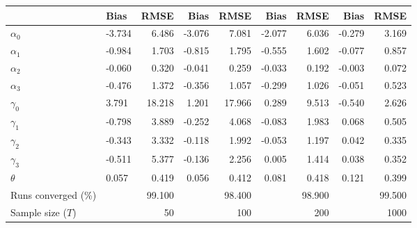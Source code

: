 
\begin{tabular}[t]{llrrrrrrr}
\toprule
  & Bias & RMSE & Bias & RMSE & Bias & RMSE & Bias & RMSE\\
\midrule
$\alpha_{0}$ & -3.734 & 6.486 & -3.076 & 7.081 & -2.077 & 6.036 & -0.279 & 3.169\\
$\alpha_{1}$ & -0.984 & 1.703 & -0.815 & 1.795 & -0.555 & 1.602 & -0.077 & 0.857\\
$\alpha_{2}$ & -0.060 & 0.320 & -0.041 & 0.259 & -0.033 & 0.192 & -0.003 & 0.072\\
$\alpha_{3}$ & -0.476 & 1.372 & -0.356 & 1.057 & -0.299 & 1.026 & -0.051 & 0.523\\
$\gamma_{0}$ & 3.791 & 18.218 & 1.201 & 17.966 & 0.289 & 9.513 & -0.540 & 2.626\\
$\gamma_{1}$ & -0.798 & 3.889 & -0.252 & 4.068 & -0.083 & 1.983 & 0.068 & 0.505\\
$\gamma_{2}$ & -0.343 & 3.332 & -0.118 & 1.992 & -0.053 & 1.197 & 0.042 & 0.335\\
$\gamma_{3}$ & -0.511 & 5.377 & -0.136 & 2.256 & 0.005 & 1.414 & 0.038 & 0.352\\
$\theta$ & 0.057 & 0.419 & 0.056 & 0.412 & 0.081 & 0.418 & 0.121 & 0.399\\
Runs converged (\%) &  & 99.100 &  & 98.400 &  & 98.900 &  & 99.500\\
Sample size ($T$) &  & 50 &  & 100 &  & 200 &  & 1000\\
\bottomrule
\end{tabular}
